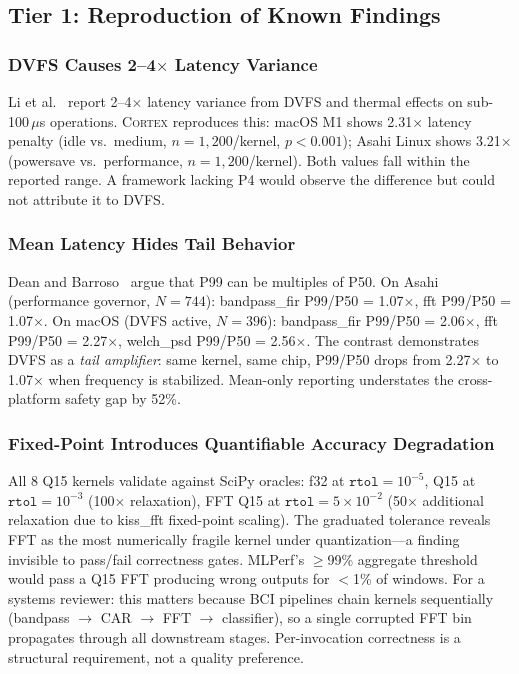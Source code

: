 \documentclass[sigplan,10pt]{acmart}
\newcommand{\cortex}{\textsc{Cortex}}
\begin{document}
\subsection{Tier 1: Reproduction of Known Findings}

\subsubsection{DVFS Causes 2--4$\times$ Latency Variance}

Li et al.~\cite{li2014tail} report 2--4$\times$ latency variance from DVFS and thermal effects on sub-100\,$\mu$s operations. \cortex{} reproduces this: macOS M1 shows 2.31$\times$ latency penalty (idle vs.\ medium, $n=1{,}200$/kernel, $p < 0.001$); Asahi Linux shows 3.21$\times$ (powersave vs.\ performance, $n=1{,}200$/kernel). Both values fall within the reported range. A framework lacking P4 would observe the difference but could not attribute it to DVFS.

\subsubsection{Mean Latency Hides Tail Behavior}

Dean and Barroso~\cite{dean2013tail} argue that P99 can be multiples of P50. On Asahi (performance governor, $N=744$): bandpass\_fir P99/P50 = 1.07$\times$, fft P99/P50 = 1.07$\times$. On macOS (DVFS active, $N=396$): bandpass\_fir P99/P50 = 2.06$\times$, fft P99/P50 = 2.27$\times$, welch\_psd P99/P50 = 2.56$\times$. The contrast demonstrates DVFS as a \emph{tail amplifier}: same kernel, same chip, P99/P50 drops from 2.27$\times$ to 1.07$\times$ when frequency is stabilized. Mean-only reporting understates the cross-platform safety gap by 52\%.

\subsubsection{Fixed-Point Introduces Quantifiable Accuracy Degradation}
\label{sec:q15}

All 8 Q15 kernels validate against SciPy oracles: f32 at $\texttt{rtol}=10^{-5}$, Q15 at $\texttt{rtol}=10^{-3}$ (100$\times$ relaxation), FFT Q15 at $\texttt{rtol}=5\times10^{-2}$ (50$\times$ additional relaxation due to kiss\_fft fixed-point scaling). The graduated tolerance reveals FFT as the most numerically fragile kernel under quantization---a finding invisible to pass/fail correctness gates. MLPerf's $\geq$99\% aggregate threshold would pass a Q15 FFT producing wrong outputs for $<$1\% of windows. For a systems reviewer: this matters because BCI pipelines chain kernels sequentially (bandpass $\to$ CAR $\to$ FFT $\to$ classifier), so a single corrupted FFT bin propagates through all downstream stages. Per-invocation correctness is a structural requirement, not a quality preference.
\end{document}
